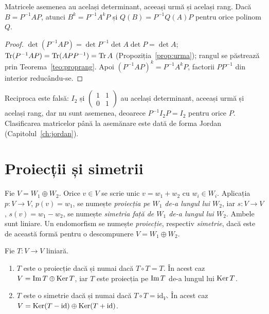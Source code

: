 \begin{propozitie}\label{prop:invarianti}
Matricele asemenea au același determinant, aceeași urmă și același rang. Dacă $B=P^{-1}AP$, atunci $B^k=P^{-1}A^kP$ și $Q(B)=P^{-1}Q(A)P$ pentru orice polinom $Q$.
\end{propozitie}

\begin{proof}
$\det(P^{-1}AP)=\det P^{-1}\det A\det P=\det A$; $\operatorname{Tr}(P^{-1}AP)=\operatorname{Tr}(APP^{-1})=\operatorname{Tr} A$ (Propoziția~\ref{prop:urma}); rangul se păstrează prin Teorema~\ref{teo:proprang}. Apoi $(P^{-1}AP)^k=P^{-1}A^kP$, factorii $PP^{-1}$ din interior reducându-se.
\end{proof}

\begin{observatie}
Reciproca este falsă: $I_2$ și $\begin{pmatrix}1&1\\0&1\end{pmatrix}$ au același determinant, aceeași urmă și același rang, dar nu sunt asemenea, deoarece $P^{-1}I_2P=I_2$ pentru orice $P$. Clasificarea matricelor până la asemănare este dată de forma Jordan (Capitolul~\ref{ch:jordan}).
\end{observatie}

\section{Proiecții și simetrii}

\begin{definitie}
Fie $V=W_1\oplus W_2$. Orice $v\in V$ se scrie unic $v=w_1+w_2$ cu $w_i\in W_i$. Aplicația $p:V\to V$, $p(v)=w_1$, se numește \emph{proiecția pe $W_1$ de-a lungul lui $W_2$}, iar $s:V\to V$, $s(v)=w_1-w_2$, se numește \emph{simetria față de $W_1$ de-a lungul lui $W_2$}. Ambele sunt liniare. Un endomorfism se numește \emph{proiecție}, respectiv \emph{simetrie}, dacă este de această formă pentru o descompunere $V=W_1\oplus W_2$.
\end{definitie}

\begin{teorema}\label{teo:proiectii}
Fie $T:V\to V$ liniară.
\begin{enumerate}
\item $T$ este o proiecție dacă și numai dacă $T\circ T=T$. În acest caz $V=\operatorname{Im} T\oplus\operatorname{Ker} T$, iar $T$ este proiecția pe $\operatorname{Im} T$ de-a lungul lui $\operatorname{Ker} T$.
\item $T$ este o simetrie dacă și numai dacă $T\circ T=\mathrm{id}_V$. În acest caz $V=\operatorname{Ker}(T-\mathrm{id})\oplus\operatorname{Ker}(T+\mathrm{id})$.
\end{enumerate}
\end{teorema}

